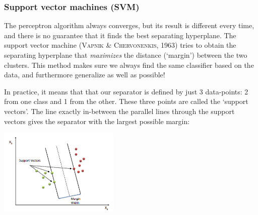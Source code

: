 \documentclass{article}
\begin{document}
\subsubsection{Support vector machines (SVM)}
The perceptron algorithm always converges, but its result is different every time, and there is no guarantee that it finds the best separating hyperplane. The support vector machine (\textsc{Vapnik \& Chervonenkis}, 1963) tries to obtain the separating hyperplane that \textit{maximizes} the distance (`margin') between the two clusters. This method makes sure we always find the same classifier based on the data, and furthermore generalize as well as possible!
\begin{spexample}
    In practice, it means that that our separator is defined by just 3 data-points: 2 from one class and 1 from the other. These three points are called the `support vectors'. 
    The line exactly in-between the parallel lines through the support vectors gives the separator with the largest possible margin:
    \begin{center}\includegraphics[width=0.43\textwidth]{SVM.png}\end{center}
\end{spexample}
\end{document}
